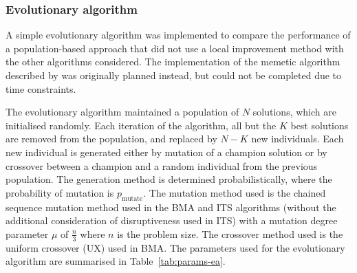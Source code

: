 {{    %

    \subsubsection{Evolutionary algorithm} {
    \label{sec:method-ea}

        A simple evolutionary algorithm was implemented to compare the performance of a population-based approach that did not use a local improvement method with the other algorithms considered.
        The implementation of the memetic algorithm described by \citep{Harris:2015kw} was originally planned instead, but could not be completed due to time constraints.

        The evolutionary algorithm maintained a population of \(N\) solutions, which are initialised randomly.
        Each iteration of the algorithm, all but the \(K\) best solutions are removed from the population, and replaced by \(N-K\) new individuals.
        Each new individual is generated either by mutation of a champion solution or by crossover between a champion and a random individual from the previous population.
        The generation method is determined probabilistically, where the probability of mutation is \(p_\text{mutate}\).
        The mutation method used is the chained sequence mutation method used in the BMA and ITS algorithms (without the additional consideration of disruptiveness used in ITS) with a mutation degree parameter \(\mu\) of \(\frac{n}{3}\) where \(n\) is the problem size.
        The crossover method used is the uniform crossover (UX) used in BMA.
        The parameters used for the evolutionary algorithm are summarised in Table~\ref{tab:params-ea}.

}}}

